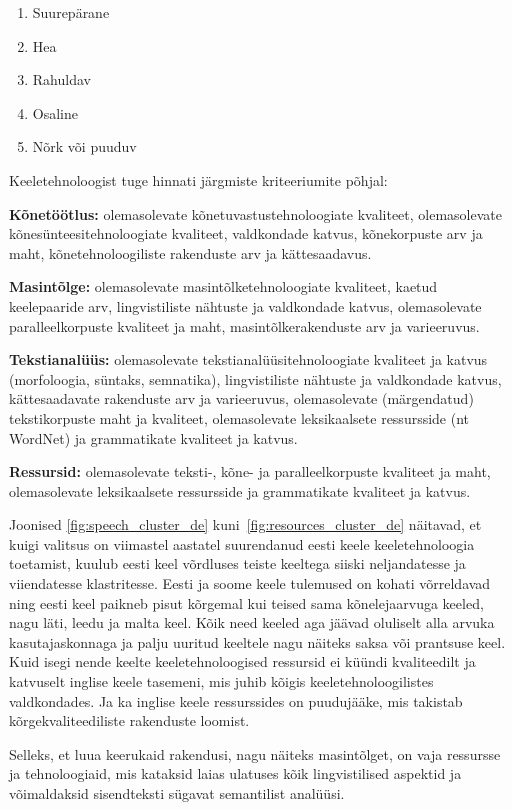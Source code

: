 \begin{multicols}{2}
\begin{enumerate}
\item Suurepärane
\item Hea
\item Rahuldav
\item Osaline
\item Nõrk või puuduv
\end{enumerate}

Keeletehnoloogist tuge hinnati järgmiste kriteeriumite põhjal:

\textbf{Kõnetöötlus:} olemasolevate kõnetuvastustehnoloogiate kvaliteet, olemasolevate kõnesünteesitehnoloogiate kvaliteet, valdkondade katvus, kõnekorpuste arv ja maht, kõnetehnoloogiliste rakenduste arv ja kättesaadavus.

\textbf{Masintõlge:} olemasolevate masintõlketehnoloogiate kvaliteet, kaetud keelepaaride arv, lingvistiliste nähtuste ja valdkondade katvus, olemasolevate paralleelkorpuste kvaliteet ja maht, masintõlkerakenduste arv ja varieeruvus.

\textbf{Tekstianalüüs:} olemasolevate tekstianalüüsitehnoloogiate kvaliteet ja katvus (morfoloogia, süntaks, semnatika), lingvistiliste nähtuste ja valdkondade katvus, kättesaadavate rakenduste arv ja varieeruvus, olemasolevate (märgendatud) tekstikorpuste maht ja kvaliteet, olemasolevate leksikaalsete ressursside (nt WordNet) ja grammatikate kvaliteet ja katvus.

\textbf{Ressursid:} olemasolevate teksti-, kõne- ja paralleelkorpuste kvaliteet ja maht, olemasolevate leksikaalsete ressursside ja grammatikate kvaliteet ja katvus.

Joonised \ref{fig:speech_cluster_de} kuni~\ref{fig:resources_cluster_de} näitavad, et kuigi valitsus on viimastel aastatel suurendanud eesti keele keeletehnoloogia toetamist, kuulub eesti keel võrdluses teiste keeltega siiski neljandatesse ja viiendatesse klastritesse.  Eesti ja soome keele tulemused on kohati võrreldavad ning eesti keel paikneb pisut kõrgemal kui teised sama kõnelejaarvuga keeled, nagu läti, leedu ja malta keel.  Kõik need keeled aga jäävad oluliselt alla arvuka kasutajaskonnaga ja palju uuritud keeltele nagu näiteks saksa või prantsuse keel.  Kuid isegi nende keelte keeletehnoloogised ressursid ei küündi kvaliteedilt ja katvuselt inglise keele tasemeni, mis juhib kõigis keeletehnoloogilistes valdkondades.  Ja ka inglise keele ressurssides on puudujääke, mis takistab kõrgekvaliteediliste rakenduste loomist.

Selleks, et luua keerukaid rakendusi, nagu näiteks masintõlget, on vaja ressursse ja tehnoloogiaid, mis kataksid laias ulatuses kõik lingvistilised aspektid ja võimaldaksid sisendteksti sügavat semantilist analüüsi.


\end{multicols}
